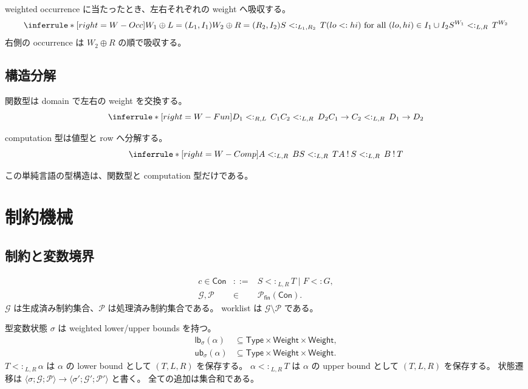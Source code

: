 \documentclass[uplatex,dvipdfmx,a4paper,11pt]{jsarticle}
\theoremstyle{jpplain}
\newcommand{\Weight}{\mathsf{Weight}}
\newcommand{\fin}{\mathsf{fin}}
\newcommand{\ub}{\mathsf{ub}}
\newcommand{\lb}{\mathsf{lb}}
\newcommand{\eff}{\mathbin{!}}
\newcommand{\subty}[3]{#1\mathrel{<:}_{#2,#3}}
\newcommand{\wocc}[2]{#1^{#2}}
\newcommand{\compose}{\mathbin{\oplus}}
\begin{document}
weighted occurrence に当たったとき、左右それぞれの weight へ吸収する。
\[
\inferrule*[right=W-Occ]
 {W_1\compose L=(L_1,I_1)\\
  W_2\compose R=(R_2,I_2)\\
  \subty{S}{L_1}{R_2}\,T\\
 (lo<:hi)\ \text{for all }(lo,hi)\in I_1\cup I_2}
 {\subty{\wocc{S}{W_1}}{L}{R}\,\wocc{T}{W_2}}
\]
右側の occurrence は \(W_2\compose R\) の順で吸収する。

\subsection{構造分解}

関数型は domain で左右の weight を交換する。
\[
\inferrule*[right=W-Fun]
 {\subty{D_1}{R}{L}\,C_1\\
  \subty{C_2}{L}{R}\,D_2}
 {\subty{C_1\to C_2}{L}{R}\,D_1\to D_2}
\]

computation 型は値型と row へ分解する。
\[
\inferrule*[right=W-Comp]
 {\subty{A}{L}{R}\,B\\
  \subty{S}{L}{R}\,T}
 {\subty{A\eff S}{L}{R}\,B\eff T}
\]

この単純言語の型構造は、関数型と computation 型だけである。

\section{制約機械}

\subsection{制約と変数境界}

\[
\begin{array}{rcl}
c\in\mathsf{Con} &::=& \subty{S}{L}{R}\,T \mid F<:G,\\
\mathcal G,\mathcal P &\in& \mathcal P_{\fin}(\mathsf{Con}).
\end{array}
\]
\(\mathcal G\) は生成済み制約集合、\(\mathcal P\) は処理済み制約集合である。
worklist は \(\mathcal G\setminus\mathcal P\) である。

型変数状態 \(\sigma\) は weighted lower/upper bounds を持つ。
\[
\begin{aligned}
 \lb_\sigma(\alpha)&\subseteq \mathsf{Type}\times\Weight\times\Weight,\\
 \ub_\sigma(\alpha)&\subseteq \mathsf{Type}\times\Weight\times\Weight.
\end{aligned}
\]
\(\subty{T}{L}{R}\,\alpha\) は \(\alpha\) の lower bound として \((T,L,R)\) を保存する。
\(\subty{\alpha}{L}{R}\,T\) は \(\alpha\) の upper bound として \((T,L,R)\) を保存する。
状態遷移は \(\langle\sigma;\mathcal G;\mathcal P\rangle
\to\langle\sigma';\mathcal G';\mathcal P'\rangle\) と書く。
全ての追加は集合和である。
\end{document}
